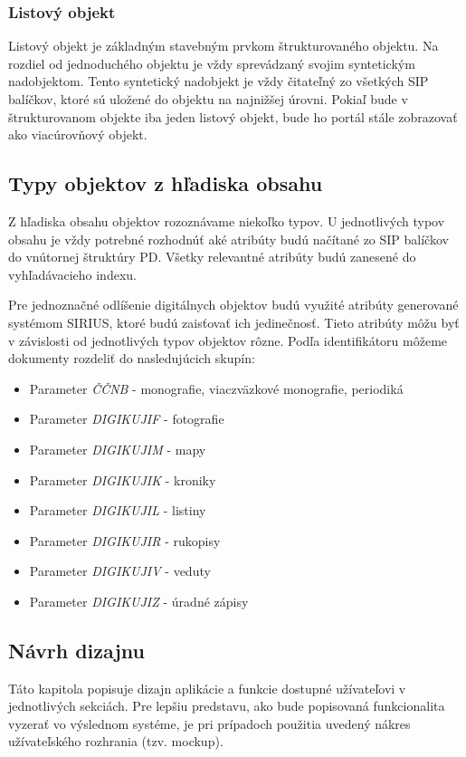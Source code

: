 \documentclass[
  print, %
  table,   %
  lof,     %
  nolot,     %
]{fithesis3}
\begin{document}
\subsubsection{Listový objekt}	
Listový objekt je základným stavebným prvkom štrukturovaného objektu. Na rozdiel od jednoduchého objektu je vždy sprevádzaný svojim syntetickým nadobjektom. Tento syntetický nadobjekt je vždy čitateľný zo všetkých SIP balíčkov, ktoré sú uložené do objektu na najnižšej úrovni. Pokiaľ bude v štrukturovanom objekte iba jeden listový objekt, bude ho portál stále zobrazovať ako viacúrovňový objekt.
\subsection{Typy objektov z hľadiska obsahu}
Z hľadiska obsahu objektov rozoznávame niekoľko typov. U jednotlivých typov obsahu je vždy potrebné rozhodnúť aké atribúty budú načítané zo SIP balíčkov do vnútornej štruktúry PD. Všetky relevantné atribúty budú zanesené do vyhľadávacieho indexu.

Pre jednoznačné odlíšenie digitálnych objektov budú využité atribúty generované systémom SIRIUS, ktoré budú zaisťovať ich jedinečnosť. Tieto atribúty môžu byť v závislosti od jednotlivých typov objektov rôzne. Podľa identifikátoru môžeme dokumenty rozdeliť do nasledujúcich skupín:
\begin{itemize}
	\item Parameter \textit{ČČNB} - monografie, viaczväzkové monografie, periodiká
	\item Parameter \textit{DIGIKUJIF} - fotografie
	\item Parameter \textit{DIGIKUJIM} - mapy
	\item Parameter \textit{DIGIKUJIK} - kroniky
	\item Parameter \textit{DIGIKUJIL} - listiny
	\item Parameter \textit{DIGIKUJIR} - rukopisy
	\item Parameter	\textit{DIGIKUJIV} - veduty
	\item Parameter \textit{DIGIKUJIZ} - úradné zápisy
\end{itemize}
\subsection{Návrh dizajnu}
Táto kapitola popisuje dizajn aplikácie a funkcie dostupné užívateľovi v jednotlivých sekciách.	Pre lepšiu predstavu, ako bude popisovaná funkcionalita vyzerať vo výslednom systéme, je pri prípadoch použitia uvedený nákres užívateľského rozhrania (tzv. mockup).
\end{document}

